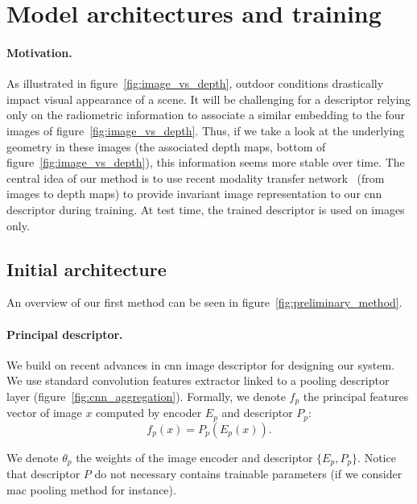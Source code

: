 \section{Model architectures and training}
\label{sec:preliminary_work}

\paragraph{Motivation.}

As illustrated in figure~\ref{fig:image_vs_depth}, outdoor conditions drastically impact visual appearance of a scene. It will be challenging for a descriptor relying only on the radiometric information to associate a similar embedding to the four images of figure~\ref{fig:image_vs_depth}. Thus, if we take a look at the underlying geometry in these images (\ie the associated depth maps, bottom of figure~\ref{fig:image_vs_depth}), this information seems more stable over time. The central idea of our method is to use recent modality transfer network~\citep{Eigen2014, Godard2017, Mahjourian2018} (from images to depth maps) to provide invariant image representation to our \ac{cnn} descriptor during training. At test time, the trained descriptor is used on images only.

\subsection{Initial architecture}

An overview of our first method can be seen in figure~\ref{fig:preliminary_method}.

\paragraph{Principal descriptor.}
We build on recent advances in \ac{cnn} image descriptor for designing our system. We use standard convolution features extractor linked to a pooling descriptor layer (figure~\ref{fig:cnn_aggregation}). Formally, we denote $f_p$ the principal features vector of image $x$ computed by encoder $E_p$ and descriptor $P_p$:
\begin{equation}
	\label{eq:desc_details}
	f_p(x) = P_p(E_p(x)).
\end{equation}

We denote $\theta_{p}$ the weights of the image encoder and descriptor $\{E_p, P_p\}$. Notice that descriptor $P$ do not necessary contains trainable parameters (if we consider \ac{mac} pooling method for instance).

